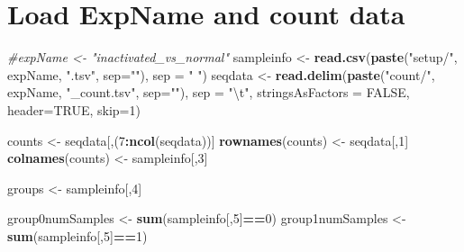 \documentclass[]{article}
\newenvironment{Shaded}{\begin{snugshade}}{\end{snugshade}}
\newcommand{\KeywordTok}[1]{\textcolor[rgb]{0.13,0.29,0.53}{\textbf{#1}}}
\newcommand{\DataTypeTok}[1]{\textcolor[rgb]{0.13,0.29,0.53}{#1}}
\newcommand{\DecValTok}[1]{\textcolor[rgb]{0.00,0.00,0.81}{#1}}
\newcommand{\CharTok}[1]{\textcolor[rgb]{0.31,0.60,0.02}{#1}}
\newcommand{\StringTok}[1]{\textcolor[rgb]{0.31,0.60,0.02}{#1}}
\newcommand{\CommentTok}[1]{\textcolor[rgb]{0.56,0.35,0.01}{\textit{#1}}}
\newcommand{\OtherTok}[1]{\textcolor[rgb]{0.56,0.35,0.01}{#1}}
\newcommand{\OperatorTok}[1]{\textcolor[rgb]{0.81,0.36,0.00}{\textbf{#1}}}
\newcommand{\NormalTok}[1]{#1}
\begin{document}
\begin{Shaded}
\end{Shaded}

\section{Load ExpName and count data}\label{load-expname-and-count-data}

\begin{Shaded}
\begin{Highlighting}[]
\CommentTok{#expName <- "inactivated_vs_normal"}
\NormalTok{sampleinfo <-}\StringTok{ }\KeywordTok{read.csv}\NormalTok{(}\KeywordTok{paste}\NormalTok{(}\StringTok{"setup/"}\NormalTok{, expName, }\StringTok{".tsv"}\NormalTok{, }\DataTypeTok{sep=}\StringTok{""}\NormalTok{), }\DataTypeTok{sep =} \StringTok{" "}\NormalTok{)}
\NormalTok{seqdata <-}\StringTok{ }\KeywordTok{read.delim}\NormalTok{(}\KeywordTok{paste}\NormalTok{(}\StringTok{"count/"}\NormalTok{, expName, }\StringTok{"_count.tsv"}\NormalTok{, }\DataTypeTok{sep=}\StringTok{""}\NormalTok{), }\DataTypeTok{sep =} \StringTok{"}\CharTok{\textbackslash{}t}\StringTok{"}\NormalTok{, }\DataTypeTok{stringsAsFactors =} \OtherTok{FALSE}\NormalTok{, }\DataTypeTok{header=}\OtherTok{TRUE}\NormalTok{, }\DataTypeTok{skip=}\DecValTok{1}\NormalTok{)}

\NormalTok{counts <-}\StringTok{ }\NormalTok{seqdata[,(}\DecValTok{7}\OperatorTok{:}\KeywordTok{ncol}\NormalTok{(seqdata))]}
\KeywordTok{rownames}\NormalTok{(counts) <-}\StringTok{ }\NormalTok{seqdata[,}\DecValTok{1}\NormalTok{]}
\KeywordTok{colnames}\NormalTok{(counts) <-}\StringTok{ }\NormalTok{sampleinfo[,}\DecValTok{3}\NormalTok{]}

\NormalTok{groups <-}\StringTok{ }\NormalTok{sampleinfo[,}\DecValTok{4}\NormalTok{]}

\NormalTok{group0numSamples <-}\StringTok{ }\KeywordTok{sum}\NormalTok{(sampleinfo[,}\DecValTok{5}\NormalTok{]}\OperatorTok{==}\DecValTok{0}\NormalTok{)}
\NormalTok{group1numSamples <-}\StringTok{ }\KeywordTok{sum}\NormalTok{(sampleinfo[,}\DecValTok{5}\NormalTok{]}\OperatorTok{==}\DecValTok{1}\NormalTok{)}
\end{Highlighting}
\end{Shaded}
\end{document}
